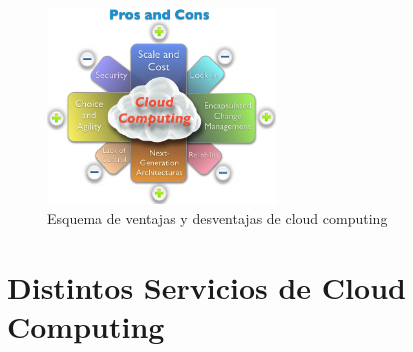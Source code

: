 \documentclass[12pt,a4paper]{article}
\begin{document}
\begin{figure}[h!]
 \centering
 \includegraphics[width=0.54\textwidth]{cc_pros.png}
\caption[Pros Cloud Computing]{Esquema de ventajas y desventajas de cloud computing}
\end{figure}\par


\section{Distintos Servicios de Cloud Computing}
\end{document}
